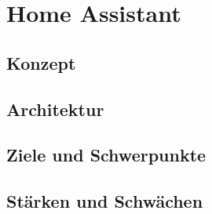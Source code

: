 \section{Home Assistant}
\label{sec:homeassistant}
\subsection{Konzept}
\subsection{Architektur}
\subsection{Ziele und Schwerpunkte}
\subsection{Stärken und Schwächen}
